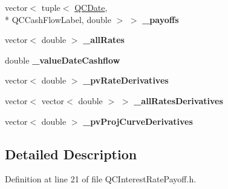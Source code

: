 \begin{DoxyCompactItemize}
\item 
\hypertarget{class_q_c_interest_rate_payoff_a29527bbc61ba81fa84e9978f7fd94edb}{vector$<$ tuple$<$ \hyperlink{class_q_c_date}{Q\+C\+Date}, \\*
Q\+C\+Cash\+Flow\+Label, double $>$ $>$ {\bfseries \+\_\+payoffs}}\label{class_q_c_interest_rate_payoff_a29527bbc61ba81fa84e9978f7fd94edb}

\item 
\hypertarget{class_q_c_interest_rate_payoff_a0055baa42a22388a201534c188403d07}{vector$<$ double $>$ {\bfseries \+\_\+all\+Rates}}\label{class_q_c_interest_rate_payoff_a0055baa42a22388a201534c188403d07}

\item 
\hypertarget{class_q_c_interest_rate_payoff_a832d4808ce5a927c22096dcf9c699c47}{double {\bfseries \+\_\+value\+Date\+Cashflow}}\label{class_q_c_interest_rate_payoff_a832d4808ce5a927c22096dcf9c699c47}

\item 
\hypertarget{class_q_c_interest_rate_payoff_a3016cee34dde022c62757714d9dc3431}{vector$<$ double $>$ {\bfseries \+\_\+pv\+Rate\+Derivatives}}\label{class_q_c_interest_rate_payoff_a3016cee34dde022c62757714d9dc3431}

\item 
\hypertarget{class_q_c_interest_rate_payoff_ae167b48aed467caa1ddc1392b21bc44d}{vector$<$ vector$<$ double $>$ $>$ {\bfseries \+\_\+all\+Rates\+Derivatives}}\label{class_q_c_interest_rate_payoff_ae167b48aed467caa1ddc1392b21bc44d}

\item 
\hypertarget{class_q_c_interest_rate_payoff_a4b8d7f37769cfb641ec55e06dd60f24d}{vector$<$ double $>$ {\bfseries \+\_\+pv\+Proj\+Curve\+Derivatives}}\label{class_q_c_interest_rate_payoff_a4b8d7f37769cfb641ec55e06dd60f24d}

\end{DoxyCompactItemize}


\subsection{Detailed Description}


Definition at line 21 of file Q\+C\+Interest\+Rate\+Payoff.\+h.



